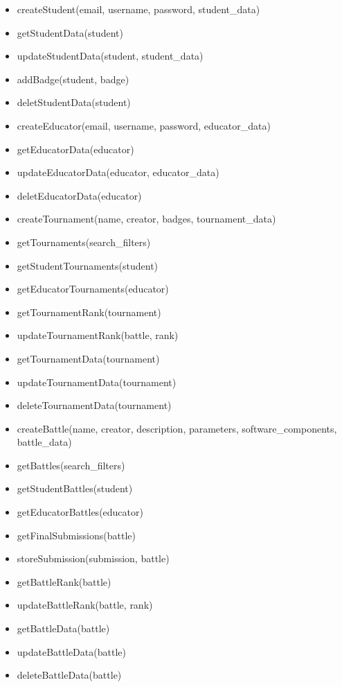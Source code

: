 \begin{itemize}
\begin{itemize}
        \item createStudent(email, username, password, student\_data)
        \item getStudentData(student)
        \item updateStudentData(student, student\_data)
        \item addBadge(student, badge)
        \item deletStudentData(student)

        \item createEducator(email, username, password, educator\_data)
        \item getEducatorData(educator)
        \item updateEducatorData(educator, educator\_data)
        \item deletEducatorData(educator)

        \item createTournament(name, creator, badges, tournament\_data)
        \item getTournaments(search\_filters)
        \item getStudentTournaments(student)
        \item getEducatorTournaments(educator)
        \item getTournamentRank(tournament)
        \item updateTournamentRank(battle, rank)
        \item getTournamentData(tournament)
        \item updateTournamentData(tournament)
        \item deleteTournamentData(tournament)

        \item createBattle(name, creator, description, parameters, software\_components, battle\_data)
        \item getBattles(search\_filters)
        \item getStudentBattles(student)
        \item getEducatorBattles(educator)
        \item getFinalSubmissions(battle)
        \item storeSubmission(submission, battle)
        \item getBattleRank(battle)
        \item updateBattleRank(battle, rank)
        \item getBattleData(battle)
        \item updateBattleData(battle)
        \item deleteBattleData(battle)

        
    \end{itemize}
    
 \end{itemize}

